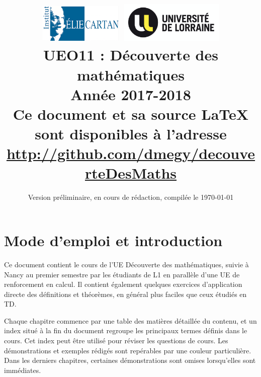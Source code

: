 \documentclass[11pt,a4paper]{book}
\theoremstyle{definition}
\theoremstyle{plain}
\begin{document}
\title{
\includegraphics[width=4cm]{logo-IECL}
\hfill
\includegraphics[width=5cm]{logo-UL}\\
\vspace{3em}
UEO11 : Découverte des mathématiques\\
Année 2017-2018\\
\vspace{3em}
{\small \faGithub{}  Ce document et sa source \LaTeX{} sont disponibles à l'adresse\\
\url{http://github.com/dmegy/decouverteDesMaths}}
}

\date{Version préliminaire, en cours de rédaction, compilée le \today{}%
}


\maketitle

\tableofcontents



\section{Mode d'emploi et introduction}

Ce document contient le cours de l'UE \og Découverte des mathématiques\fg{}, suivie à Nancy au premier semestre par les étudiants de L1 en parallèle d'une UE de renforcement en calcul. Il contient également quelques exercices d'application directe des définitions et théorèmes, en général plus faciles que ceux étudiés en TD.

Chaque chapitre commence par une table des matières détaillée du contenu, et un index situé à la fin du document regroupe les principaux termes définis dans le cours. Cet index peut être utilisé pour réviser les questions de cours. Les démonstrations et exemples rédigés sont repérables par une couleur particulière. Dans les derniers chapitres, certaines démonstrations sont omises lorsqu'elles sont immédiates.
\end{document}
